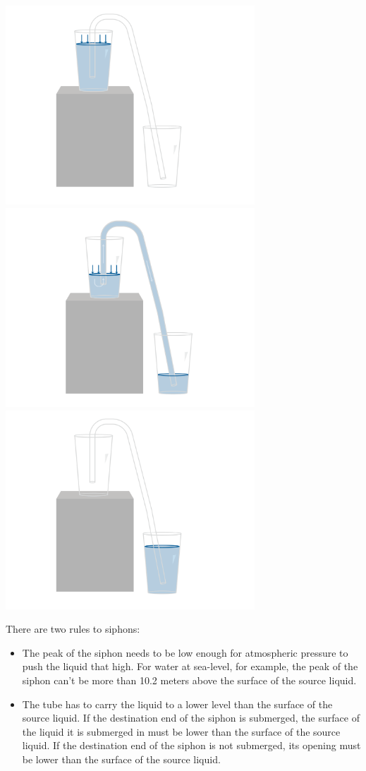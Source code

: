 \includegraphics[width=0.7\textwidth]{siphonStraw1.png}
\includegraphics[width=0.7\textwidth]{siphonStraw2.png}
\includegraphics[width=0.7\textwidth]{siphonStraw3.png}


There are two rules to siphons:
\begin{itemize}
\item The peak of the siphon needs to be low enough for atmospheric pressure to push the liquid that high.  For water at sea-level, for example,  the peak of the siphon can't be more than 10.2 meters above the surface of the source liquid. 

\item  The tube has to carry the liquid to a lower level than the surface of the source liquid.   If the destination end of the siphon is submerged,  the surface of the liquid it is submerged in must be lower than the surface of the source liquid.  If the destination end of the siphon is not submerged,  its opening must be lower than the surface of the source liquid.
\end{itemize}

